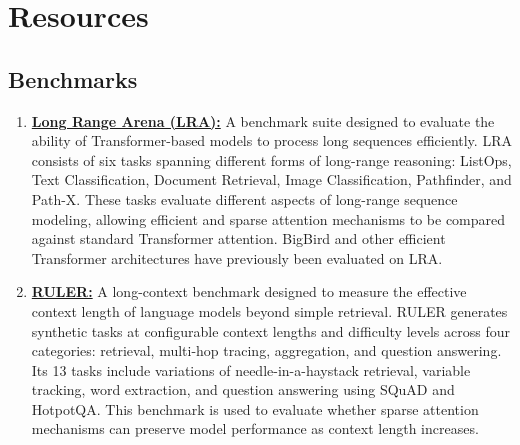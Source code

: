 \documentclass{article}
\begin{document}


\section{Resources}

\subsection{Benchmarks}

\begin{enumerate}

\item \href{https://github.com/google-research/long-range-arena}{\textbf{Long Range Arena (LRA):}} A benchmark suite designed to evaluate the ability of Transformer-based models to process long sequences efficiently. LRA consists of six tasks spanning different forms of long-range reasoning: ListOps, Text Classification, Document Retrieval, Image Classification, Pathfinder, and Path-X. These tasks evaluate different aspects of long-range sequence modeling, allowing efficient and sparse attention mechanisms to be compared against standard Transformer attention. BigBird and other efficient Transformer architectures have previously been evaluated on LRA. \cite{lra}

\item \href{https://github.com/NVIDIA/RULER}{\textbf{RULER:}} A long-context benchmark designed to measure the effective context length of language models beyond simple retrieval. RULER generates synthetic tasks at configurable context lengths and difficulty levels across four categories: retrieval, multi-hop tracing, aggregation, and question answering. Its 13 tasks include variations of needle-in-a-haystack retrieval, variable tracking, word extraction, and question answering using SQuAD and HotpotQA. This benchmark is used to evaluate whether sparse attention mechanisms can preserve model performance as context length increases. \cite{ruler}


\end{enumerate}
\end{document}
